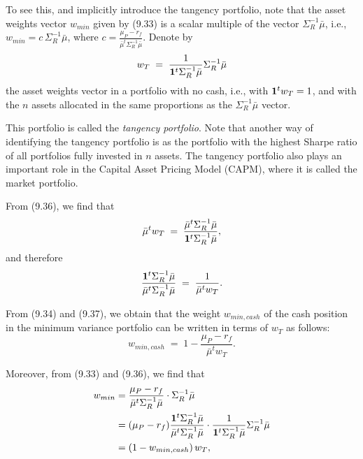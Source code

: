 To see this, and implicitly introduce the tangency portfolio, note that the asset
weights vector $w_{min}$ given by (9.33) is a scalar multiple of the vector
$\Sigma_R^{-1}\bar\mu$, i.e., $w_{min} = c\,\Sigma_R^{-1}\bar\mu$, where $c =
\frac{\mu_P-r_f}{\bar\mu^t\Sigma_R^{-1}\bar\mu}$. Denote by
\begin{equation}
w_T \;=\; \frac{1}{\mathbf{1}^t\Sigma_R^{-1}\bar\mu}\Sigma_R^{-1}\bar\mu
\end{equation}
the asset weights vector in a portfolio with no cash, i.e., with $\mathbf{1}^tw_T = 1$,
and with the $n$ assets allocated in the same proportions as the $\Sigma_R^{-1}\bar\mu$
vector.

This portfolio is called the \textit{tangency portfolio}. Note that another way of
identifying the tangency portfolio is as the portfolio with the highest Sharpe ratio of
all portfolios fully invested in $n$ assets. The tangency portfolio also plays an
important role in the Capital Asset Pricing Model (CAPM), where it is called the market
portfolio.

From (9.36), we find that
\[
\bar\mu^tw_T \;=\; \frac{\bar\mu^t\Sigma_R^{-1}\bar\mu}{\mathbf{1}^t\Sigma_R^{-1}\bar\mu},
\]
and therefore
\begin{equation}
\frac{\mathbf{1}^t\Sigma_R^{-1}\bar\mu}{\bar\mu^t\Sigma_R^{-1}\bar\mu} \;=\;
\frac{1}{\bar\mu^tw_T}.
\end{equation}

From (9.34) and (9.37), we obtain that the weight $w_{min,cash}$ of the cash position
in the minimum variance portfolio can be written in terms of $w_T$ as follows:
\begin{equation}
w_{min,cash} \;=\; 1 - \frac{\mu_P-r_f}{\bar\mu^tw_T}.
\end{equation}

Moreover, from (9.33) and (9.36), we find that
\begin{align}
w_{min} &= \frac{\mu_P-r_f}{\bar\mu^t\Sigma_R^{-1}\bar\mu} \cdot \Sigma_R^{-1}\bar\mu
\notag\\
&= (\mu_P-r_f)\frac{\mathbf{1}^t\Sigma_R^{-1}\bar\mu}{\bar\mu^t\Sigma_R^{-1}\bar\mu}
\cdot \frac{1}{\mathbf{1}^t\Sigma_R^{-1}\bar\mu}\Sigma_R^{-1}\bar\mu \notag\\
&= (1-w_{min,cash})\,w_T,
\end{align}
